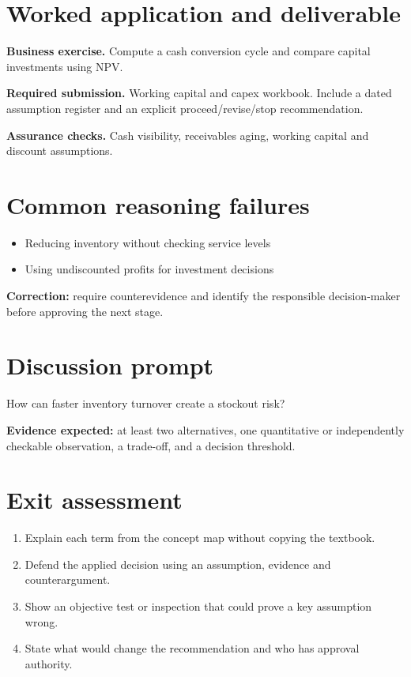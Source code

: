\documentclass[11pt,letterpaper]{article}
\begin{document}
\section{Worked application and deliverable}
\textbf{Business exercise.} Compute a cash conversion cycle and compare capital investments using NPV.\par\textbf{Required submission.} Working capital and capex workbook. Include a dated assumption register and an explicit proceed/revise/stop recommendation.\par\textbf{Assurance checks.} Cash visibility, receivables aging, working capital and discount assumptions.
\section{Common reasoning failures}
\begin{itemize}[leftmargin=*,itemsep=3pt]
\item Reducing inventory without checking service levels
\item Using undiscounted profits for investment decisions
\end{itemize}
\noindent\textbf{Correction:} require counterevidence and identify the responsible decision-maker before approving the next stage.
\section{Discussion prompt}
How can faster inventory turnover create a stockout risk?\par\medskip\textbf{Evidence expected:} at least two alternatives, one quantitative or independently checkable observation, a trade-off, and a decision threshold.
\section{Exit assessment}
\begin{enumerate}[leftmargin=*,itemsep=5pt]
\item Explain each term from the concept map without copying the textbook.
\item Defend the applied decision using an assumption, evidence and counterargument.
\item Show an objective test or inspection that could prove a key assumption wrong.
\item State what would change the recommendation and who has approval authority.
\end{enumerate}

\end{document}

